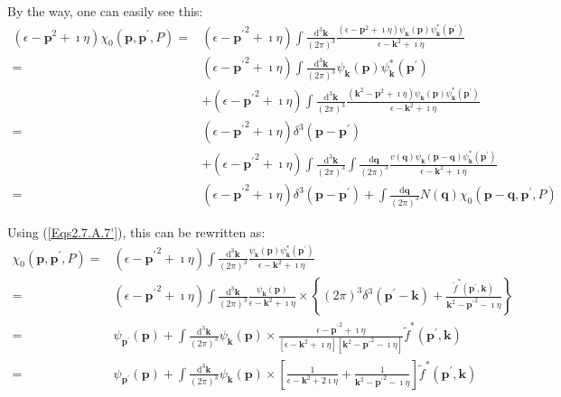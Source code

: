 By the way, one can easily see this:
\[ \begin{split}
(\epsilon-\mathbf{p}^2+\imath\eta)\chi_0(\mathbf{p},\mathbf{p}^{'},P) =& (\epsilon-{\mathbf{p}^{'}}^2+\imath\eta)\int \frac{\mathrm{d}^3 \mathbf{k}}{(2\pi)^3}\frac{(\epsilon-\mathbf{p}^2+\imath\eta)\psi_{\mathbf{k}}(\mathbf{p})\psi_{\mathbf{k}}^{*}(\mathbf{p}^{'})}{\epsilon-\mathbf{k}^2+\imath\eta}\\
=&(\epsilon-{\mathbf{p}^{'}}^2+\imath\eta)\int \frac{\mathrm{d}^3 \mathbf{k}}{(2\pi)^3}\psi_{\mathbf{k}}(\mathbf{p})\psi_{\mathbf{k}}^{*}(\mathbf{p}^{'})\\
&+(\epsilon-{\mathbf{p}^{'}}^2+\imath\eta)\int \frac{\mathrm{d}^3 \mathbf{k}}{(2\pi)^3}\frac{(\mathbf{k}^2-\mathbf{p}^2+\imath \eta)\psi_{\mathbf{k}}(\mathbf{p})\psi_{\mathbf{k}}^{*}(\mathbf{p}^{'})}{\epsilon-\mathbf{k}^2+\imath\eta}\\
=&(\epsilon-{\mathbf{p}^{'}}^2+\imath\eta)\delta^3(\mathbf{p}-\mathbf{p}^{'})\\
&+(\epsilon-{\mathbf{p}^{'}}^2+\imath\eta)\int \frac{\mathrm{d}^3 \mathbf{k}}{(2\pi)^3}\int \frac{\mathrm{d} \mathbf{q}}{(2\pi)^3} \frac{v(\mathbf{q})\psi_{\mathbf{k}}(\mathbf{p}-\mathbf{q})\psi_{\mathbf{k}}^{*}(\mathbf{p}^{'})}{\epsilon - \mathbf{k}^2+\imath \eta}\\
=&(\epsilon-{\mathbf{p}^{'}}^2+\imath\eta)\delta^3(\mathbf{p}-\mathbf{p}^{'})+\int \frac{\mathrm{d} \mathbf{q}}{(2\pi)^3} N(\mathbf{q}) \chi_0(\mathbf{p}-\mathbf{q},\mathbf{p}^{'},P)
\end{split} \]

Using (\ref{Eqs2.7.A.7'}), this can be rewritten as:
\begin{equation} \label{Eqs2.7.22} \begin{split}
\chi_0(\mathbf{p},\mathbf{p}^{'},P) =& (\epsilon-{\mathbf{p}^{'}}^2+\imath\eta)\int \frac{\mathrm{d}^3 \mathbf{k}}{(2\pi)^3}\frac{\psi_{\mathbf{k}}(\mathbf{p})\psi_{\mathbf{k}}^{*}(\mathbf{p}^{'})}{\epsilon-\mathbf{k}^2+\imath \eta}\\
=&(\epsilon-{\mathbf{p}^{'}}^2+\imath\eta)\int \frac{\mathrm{d}^3 \mathbf{k}}{(2\pi)^3}\frac{\psi_{\mathbf{k}}(\mathbf{p})}{\epsilon-\mathbf{k}^2+\imath \eta} \times \left\{ (2\pi)^3\delta^3(\mathbf{p}^{'}-\mathbf{k})+\frac{\tilde{f}^{*}(\mathbf{p}^{'},\mathbf{k})}{\mathbf{k}^2-{\mathbf{p}^{'}}^2-\imath \eta} \right\}\\
=&\psi_{\mathbf{p}^{'}}(\mathbf{p}) + \int \frac{\mathrm{d}^3 \mathbf{k}}{(2\pi)^3} \psi_{\mathbf{k}}(\mathbf{p}) \times \frac{\epsilon-{\mathbf{p}^{'}}^2+\imath \eta}{[\epsilon-\mathbf{k}^2+\imath \eta][\mathbf{k}^2-{\mathbf{p}^{'}}^2-\imath \eta]}\tilde{f}^{*}(\mathbf{p}^{'},\mathbf{k})\\
=&\psi_{\mathbf{p}^{'}}(\mathbf{p}) + \int \frac{\mathrm{d}^3 \mathbf{k}}{(2\pi)^3} \psi_{\mathbf{k}}(\mathbf{p}) \times \left[ \frac{1}{\epsilon-\mathbf{k}^2+2\imath \eta} + \frac{1}{\mathbf{k}^2-{\mathbf{p}^{'}}^2-\imath \eta} \right]\tilde{f}^{*}(\mathbf{p}^{'},\mathbf{k})
\end{split} \end{equation}


